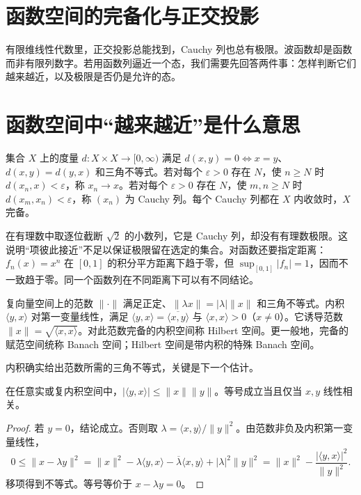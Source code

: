 \section{函数空间的完备化与正交投影}
有限维线性代数里，正交投影总能找到，Cauchy 列也总有极限。波函数却是函数而非有限列数字。若用函数列逼近一个态，我们需要先回答两件事：怎样判断它们越来越近，以及极限是否仍是允许的态。

\section{函数空间中“越来越近”是什么意思}

\begin{definition}[度量、收敛与完备]
集合 \(X\) 上的度量 \(d:X\times X\to[0,\infty)\) 满足 \(d(x,y)=0\iff x=y\)、\(d(x,y)=d(y,x)\) 和三角不等式。若对每个 \(\varepsilon>0\) 存在 \(N\)，使 \(n\ge N\) 时 \(d(x_n,x)<\varepsilon\)，称 \(x_n\to x\)。若对每个 \(\varepsilon>0\) 存在 \(N\)，使 \(m,n\ge N\) 时 \(d(x_m,x_n)<\varepsilon\)，称 \((x_n)\) 为 Cauchy 列。每个 Cauchy 列都在 \(X\) 内收敛时，\(X\) 完备。
\end{definition}

在有理数中取逐位截断 \(\sqrt2\) 的小数列，它是 Cauchy 列，却没有有理数极限。这说明“项彼此接近”不足以保证极限留在选定的集合。对函数还要指定距离：\(f_n(x)=x^n\) 在 \([0,1]\) 的积分平方距离下趋于零，但 \(\sup_{[0,1]}|f_n|=1\)，因而不一致趋于零。同一个函数列在不同距离下可以有不同结论。

\begin{definition}
复向量空间上的范数 \(\|\cdot\|\) 满足正定、\(\|\lambda x\|=|\lambda|\|x\|\) 和三角不等式。内积 \(\langle y,x\rangle\) 对第一变量线性，满足 \(\langle y,x\rangle=\overline{\langle x,y\rangle}\) 与 \(\langle x,x\rangle>0\)（\(x\ne0\)）。它诱导范数 \(\|x\|=\sqrt{\langle x,x\rangle}\)。对此范数完备的内积空间称 Hilbert 空间。更一般地，完备的赋范空间统称 Banach 空间；Hilbert 空间是带内积的特殊 Banach 空间。
\end{definition}

内积确实给出范数所需的三角不等式，关键是下一个估计。

\begin{theorem}
在任意实或复内积空间中，\(|\langle y,x\rangle|\le\|x\|\|y\|\)。等号成立当且仅当 \(x,y\) 线性相关。
\end{theorem}
\begin{proof}
若 \(y=0\)，结论成立。否则取 \(\lambda=\langle x,y\rangle/\|y\|^2\)。由范数非负及内积第一变量线性，
\[
0\le\|x-\lambda y\|^2
=\|x\|^2-\lambda\langle y,x\rangle
-\overline\lambda\langle x,y\rangle+|\lambda|^2\|y\|^2
=\|x\|^2-\frac{|\langle y,x\rangle|^2}{\|y\|^2}.
\]
移项得到不等式。等号等价于 \(x-\lambda y=0\)。
\end{proof}

